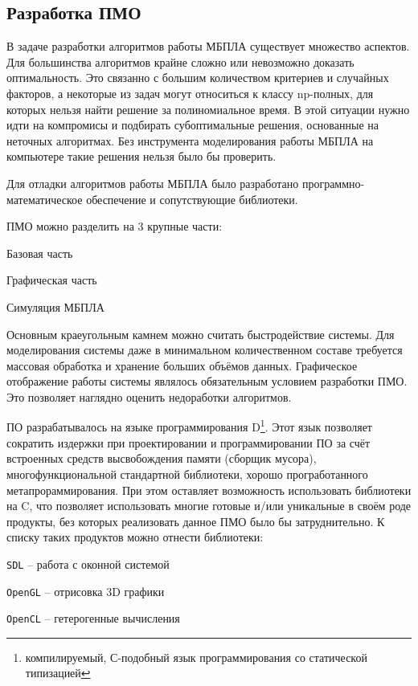 \subsection{Разработка ПМО}

В задаче разработки алгоритмов работы МБПЛА существует множество аспектов.
Для большинства алгоритмов крайне сложно или невозможно доказать оптимальность.
Это связанно с большим количеством критериев и случайных факторов, а некоторые
из задач могут относиться к классу np-полных, для которых нельзя найти
решение за полиномиальное время. В этой ситуации нужно идти на компромисы и 
подбирать субоптимальные решения, основанные на неточных алгоритмах.
Без инструмента моделирования работы МБПЛА на компьютере такие решения
нельзя было бы проверить.

Для отладки алгоритмов работы МБПЛА было разработано
программно-математическое обеспечение и сопутствующие библиотеки.

ПМО можно разделить на 3 крупные части:

\begin{mintemize}
\item Базовая часть
\item Графическая часть
\item Симуляция МБПЛА
\end{mintemize}

Основным краеугольным камнем можно считать быстродействие системы.
Для моделирования системы даже в минимальном количественном составе
требуется массовая обработка и хранение больших объёмов данных. Графическое
отображение работы системы являлось обязательным условием разработки ПМО.
Это позволяет наглядно оценить недоработки алгоритмов.

ПО разрабатывалось на языке программирования D\footnote{компилируемый, С-подобный
язык программирования со статической типизацией}. Этот язык позволяет сократить
издержки при проектировании и программировании ПО за счёт встроенных средств
высвобождения памяти (сборщик мусора), многофункциональной стандартной
библиотеки, хорошо програботанного метапрораммирования. При этом оставляет
возможность использовать библиотеки на C, что позволяет использовать
многие готовые и/или уникальные в своём роде продукты, без которых
реализовать данное ПМО было бы затруднительно. К списку таких продуктов
можно отнести библиотеки:

\begin{mintemize}
\item \verb|SDL| -- работа с оконной системой
\item \verb|OpenGL| -- отрисовка 3D графики
\item \verb|OpenCL| -- гетерогенные вычисления
\end{mintemize}

